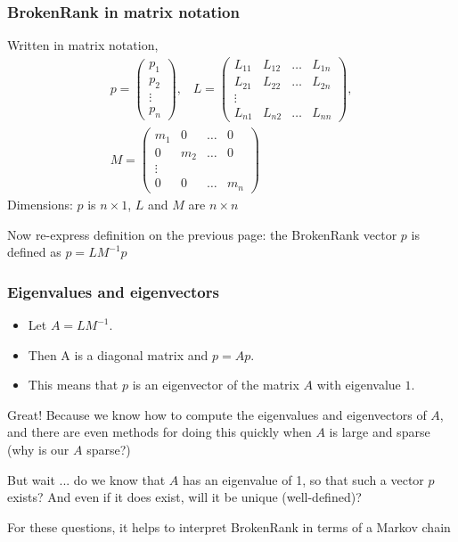 \documentclass[mathserif]{beamer}
\def\red{\color[rgb]{0.8,0,0}}
\begin{document}
\begin{frame}
\frametitle{BrokenRank in matrix notation}
Written in {\red matrix notation,}
\begin{gather*}
p = \left(\begin{array}{c}
p_1 \\ p_2 \\ \vdots \\ p_n
\end{array}\right), \;\;\;
L = \left(\begin{array}{cccc}
L_{11} & L_{12} & \ldots & L_{1n} \\
L_{21} & L_{22} & \ldots & L_{2n} \\
\vdots & & & \\
L_{n1} & L_{n2} & \ldots &  L_{nn}
\end{array}\right), \\
M = \left(\begin{array}{cccc}
m_1 & 0 & \ldots & 0 \\
0 & m_2 & \ldots & 0 \\
\vdots & & & \\
0 & 0 & \ldots & m_n
\end{array}\right)
\end{gather*}
Dimensions: $p$ is $n \times 1$, $L$ and $M$ are 
$n \times n$

\bigskip
Now re-express definition on the previous
page: the {\red BrokenRank vector $p$} is defined as
$p = LM^{-1} p$
\end{frame}

\begin{frame}
\frametitle{Eigenvalues and eigenvectors}
\begin{itemize}
\item Let $A=LM^{-1}$.
\item Then A is a diagonal matrix and $p=Ap$. 
\item This means that $p$ is an 
{\red eigenvector} of the matrix $A$ with {\red eigenvalue 
$1$}.
\end{itemize}

\bigskip
Great! Because we know how to compute the eigenvalues
and eigenvectors of $A$, and there are even methods
for doing this quickly when $A$ is {\red large
and sparse} (why is our $A$ sparse?)

\bigskip
But wait ... do we know that $A$ has an eigenvalue 
of 1, so that such a vector $p$ exists? 
And even if it does exist, will it be unique (well-defined)? 

\bigskip
For these questions, it helps to interpret 
BrokenRank in terms of a {\red Markov chain}
\end{frame}
\end{document}
